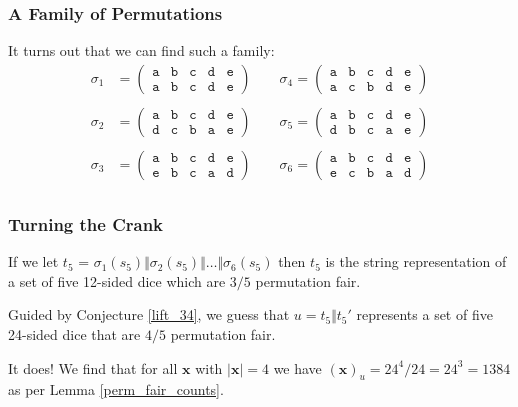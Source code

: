 \documentclass[aspectratio=169]{beamer}
\begin{document}
\begin{frame}[triangle=siiblue]
\frametitle{A Family of Permutations}
It turns out that we can find such a family:
\vfill
\begin{align*}
	\sigma_1 &= \begin{pmatrix}
		\texttt{a} & \texttt{b} & \texttt{c} & \texttt{d} & \texttt{e} \\
		\texttt{a} & \texttt{b} & \texttt{c} & \texttt{d} & \texttt{e}
		\end{pmatrix}
	\qquad
	\sigma_4 = \begin{pmatrix}
		\texttt{a} & \texttt{b} & \texttt{c} & \texttt{d} & \texttt{e} \\
		\texttt{a} & \texttt{c} & \texttt{b} & \texttt{d} & \texttt{e}
		\end{pmatrix} \\ \\
	\sigma_2 &= \begin{pmatrix}
		\texttt{a} & \texttt{b} & \texttt{c} & \texttt{d} & \texttt{e} \\
		\texttt{d} & \texttt{c} & \texttt{b} & \texttt{a} & \texttt{e}
		\end{pmatrix}
	\qquad
	\sigma_5 = \begin{pmatrix}
		\texttt{a} & \texttt{b} & \texttt{c} & \texttt{d} & \texttt{e} \\
		\texttt{d} & \texttt{b} & \texttt{c} & \texttt{a} & \texttt{e}
		\end{pmatrix} \\ \\
	\sigma_3 &= \begin{pmatrix}
		\texttt{a} & \texttt{b} & \texttt{c} & \texttt{d} & \texttt{e} \\
		\texttt{e} & \texttt{b} & \texttt{c} & \texttt{a} & \texttt{d}
		\end{pmatrix}
	\qquad
	\sigma_6 = \begin{pmatrix}
		\texttt{a} & \texttt{b} & \texttt{c} & \texttt{d} & \texttt{e} \\
		\texttt{e} & \texttt{c} & \texttt{b} & \texttt{a} & \texttt{d}
		\end{pmatrix} \\
\end{align*}
\end{frame}

\begin{frame}[triangle=siiblue]
\frametitle{Turning the Crank}
If we let $t_5$ = $\sigma_1(s_5) \Vert \sigma_2(s_5) \Vert \ldots \Vert \sigma_6(s_5)$ then $t_5$ is the string representation of a set of five 12-sided dice which are $3/5$ permutation fair. 

\vfill

Guided by Conjecture \ref{lift_34}, we guess that $u = t_5 \Vert t_5'$ represents a set of five 24-sided dice that are $4/5$ permutation fair.

\vfill

It does!  We find that for all $\mathbf{x}$ with $|\mathbf{x}| = 4$ we have $(\mathbf{x})_u = 24^4 / 24 = 24^3 = 1384$ as per Lemma \ref{perm_fair_counts}.
\end{frame}
\end{document}
